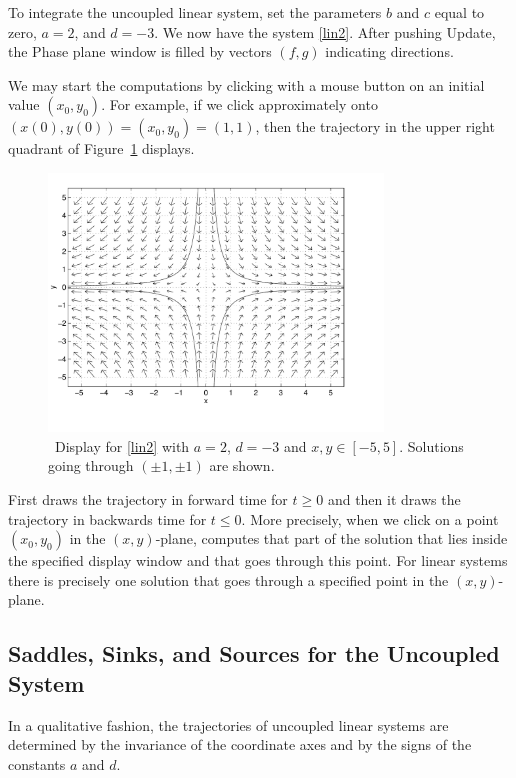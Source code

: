 \documentclass{ximera}
\begin{document}
To integrate the uncoupled linear system, set the parameters $b$
and $c$ equal to zero, $a = 2$, and $d = -3$. We now have the system \eqref{lin2}.  
After pushing {\sf Update}, the {\sf Phase plane} window is filled by vectors $(f,g)$ indicating 
directions.

We may start the computations by clicking
with a mouse button on an initial value $(x_0,y_0)$.  For example,
if we click approximately onto $(x(0),y(0))=(x_0,y_0)=(1,1)$, then
the trajectory in the upper right quadrant of
Figure~\ref{pp_dsp1} displays.

\begin{figure}[htb]
     \centerline{%
     \includegraphics[width=3.5in]{../figures/pp_dsp1.pdf}}
     \caption{{\sf \PPLANE\ Display} for \protect\eqref{lin2} with
             $a=2$, $d=-3$ and $x,y\in [-5,5]$. Solutions
             going through $(\pm 1,\pm 1)$ are shown.}
     \label{pp_dsp1}
\end{figure}

First {\pplane} draws the trajectory in forward time for
$t\ge 0$ and then it draws the trajectory in backwards time for
$t\le 0$.  More precisely, when we click on a point $(x_0,y_0)$ in
the $(x,y)$-plane, {\pplane} computes that part of the
solution that lies inside the specified {\sf display window}
and that goes through this point.  For linear systems there is
precisely one solution that goes through a specified point in
the $(x,y)$-plane. 

\subsection*{Saddles, Sinks, and Sources for the Uncoupled System \protect{\eqref{lin2}}}

In a qualitative fashion, the trajectories of uncoupled linear
systems are determined by the invariance of the coordinate axes
and by the signs of the constants $a$ and $d$.
\end{document}
